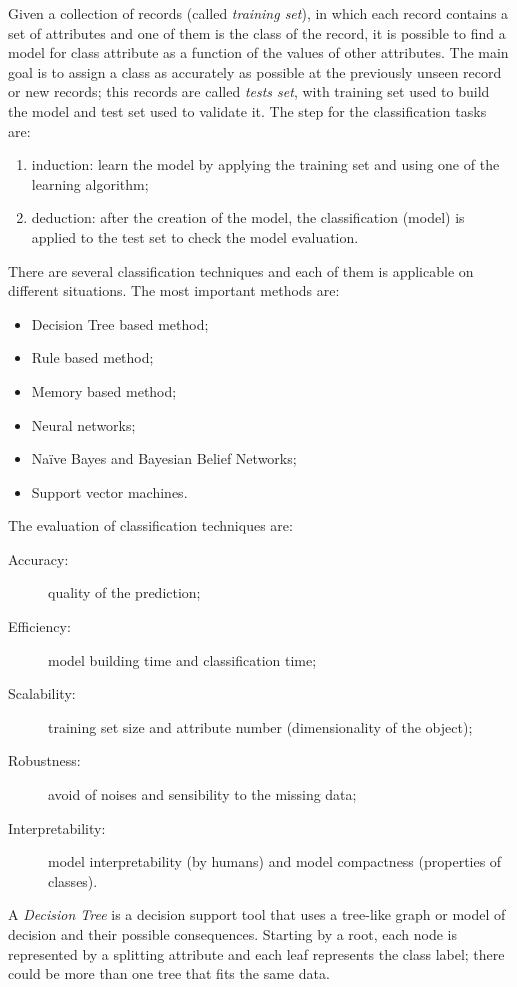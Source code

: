 Given a collection of records (called \emph{training set}), in which each record contains a set of attributes and one of them is the class of the record, it is possible to find a model for class attribute as a function of the values of other attributes.
The main goal is to assign a class as accurately as possible at the previously unseen record or new records; this records are called \emph{tests set}, with training set used to build the model and test set used to validate it.
The step for the classification tasks are:
\begin{enumerate}
	\item
	induction: learn the model by applying the training set and using one of the learning algorithm;
	\item
	deduction: after the creation of the model, the classification (model) is applied to the test set to check the model evaluation.
\end{enumerate}
There are several classification techniques and each of them is applicable on different situations.
The most important methods are:
\begin{itemize}
	\item
	Decision Tree based method;
	\item
	Rule based method;
	\item
	Memory based method;
	\item
	Neural networks;
	\item
	Na\"{i}ve Bayes and Bayesian Belief Networks;
	\item
	Support vector machines.
\end{itemize}
The evaluation of classification techniques are:
\begin{description}
	\item[Accuracy:] quality of the prediction;
	\item[Efficiency:] model building time and classification time;
	\item[Scalability:] training set size and attribute number (dimensionality of the object);
	\item[Robustness:] avoid of noises and sensibility to the missing data;
	\item[Interpretability:] model interpretability (by humans) and model compactness (properties of classes).
\end{description}
A \emph{Decision Tree} is a decision support tool that uses a tree-like graph or model of decision and their possible consequences.
Starting by a root, each node is represented by a splitting attribute and each leaf represents the class label; there could be more than one tree that fits the same data.
